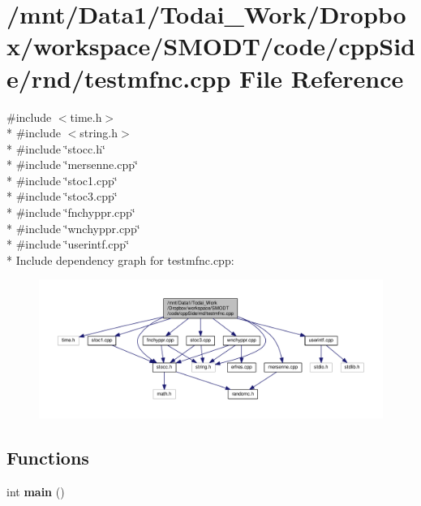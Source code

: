 \section{/mnt/\-Data1/\-Todai\-\_\-\-Work/\-Dropbox/workspace/\-S\-M\-O\-D\-T/code/cpp\-Side/rnd/testmfnc.cpp File Reference}
\label{rnd_2testmfnc_8cpp}
{\ttfamily \#include $<$time.\-h$>$}\\*
{\ttfamily \#include $<$string.\-h$>$}\\*
{\ttfamily \#include \char`\"{}stocc.\-h\char`\"{}}\\*
{\ttfamily \#include \char`\"{}mersenne.\-cpp\char`\"{}}\\*
{\ttfamily \#include \char`\"{}stoc1.\-cpp\char`\"{}}\\*
{\ttfamily \#include \char`\"{}stoc3.\-cpp\char`\"{}}\\*
{\ttfamily \#include \char`\"{}fnchyppr.\-cpp\char`\"{}}\\*
{\ttfamily \#include \char`\"{}wnchyppr.\-cpp\char`\"{}}\\*
{\ttfamily \#include \char`\"{}userintf.\-cpp\char`\"{}}\\*
Include dependency graph for testmfnc.\-cpp\-:\nopagebreak
\begin{figure}[H]
\begin{center}
\leavevmode
\includegraphics[width=350pt]{rnd_2testmfnc_8cpp__incl}
\end{center}
\end{figure}
\subsection*{Functions}
\begin{DoxyCompactItemize}
\item 
int {\bf main} ()
\end{DoxyCompactItemize}
